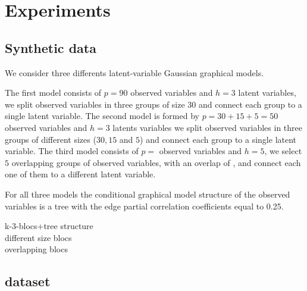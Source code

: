 \section{Experiments}
\label{experiments}

\subsection{Synthetic data}

We consider three differents latent-variable Gaussian graphical models.

The first model consists of $p=90$ observed variables and $h=3$ latent variables, we split observed variables in three groups of size $30$ and connect each group to a single latent variable. The second model is formed by $p=30+15+5=50$ observed variables and $h=3$ latents variables we split observed variables in three groups of different sizes ($30,15$ and $5$) and connect each group to a single latent variable. The third model consists of $p=$ observed variables and $h=5$, we select $5$ overlapping groups of observed variables, with an overlap of $ $, and connect each one of them to a different latent variable.

For all three models the conditional graphical model structure of the observed variables is a tree with the edge partial correlation coefficients equal to 0.25. 

k-3-blocs+tree structure\\

different size blocs\\

overlapping blocs\\

\subsection{dataset}
